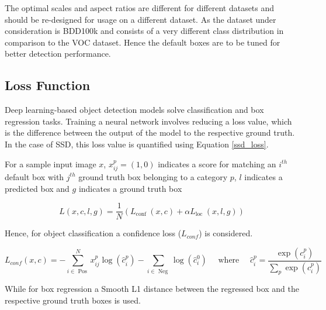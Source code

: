      The optimal scales and aspect ratios are different for different datasets and should be re-designed for usage on a different dataset. As the dataset under consideration is BDD100k \cite{bdd100k} and consists of a very different class distribution in comparison to the VOC dataset. Hence the default boxes are to be tuned for better detection performance.
     
     \subsection{Loss Function}
     Deep learning-based object detection models solve classification and box regression tasks. Training a neural network involves reducing a loss value, which is the difference between the output of the model to the respective ground truth. In the case of SSD, this loss value is quantified using Equation \ref{ssd_loss}. 
     
     For a sample input image $x$, $x^{p}_{ij} = (1,0)$ indicates a score for matching an $i^{th}$ default box with $j^{th}$ ground truth box belonging to a category $p$, $l$ indicates a predicted box and $g$ indicates a ground truth box    
     
    \begin{equation}
        L(x, c, l, g)=\frac{1}{N}\left(L_{\text {conf }}(x, c)+\alpha L_{\text {loc }}(x, l, g)\right)
        \label{ssd_loss}
    \end{equation}
     
    Hence, for object classification a confidence loss ($L_{conf}$) is considered. 
     
    \begin{equation}
        L_{c o n f}(x, c)=-\sum_{i \in \text { Pos }}^{N} x_{i j}^{p} \log \left(\hat{c}_{i}^{p}\right)-\sum_{i \in \text { Neg }} \log \left(\hat{c}_{i}^{0}\right) \quad \text { where } \quad \hat{c}_{i}^{p}=\frac{\exp \left(c_{i}^{p}\right)}{\sum_{p} \exp \left(c_{i}^{p}\right)}
    \end{equation}
     
    While for box regression a Smooth L1 distance between the regressed box and the respective ground truth boxes is used. 
     
